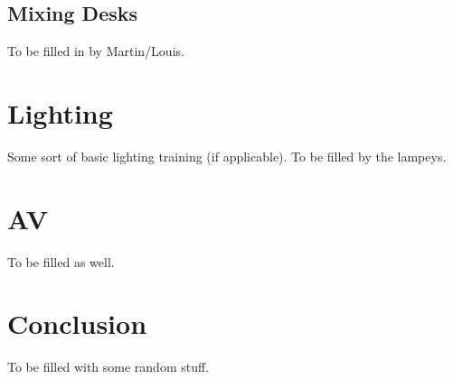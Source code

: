 \documentclass[14pt,twocolumn]{extarticle} %
\begin{document}
\subsection{Mixing Desks}
\label{mixing-desks}
To be filled in by Martin/Louis.

\section{Lighting}
\label{lighting}
Some sort of basic lighting training (if applicable). To be filled by the lampeys.

\section{AV}
\label{av}
To be filled as well.

\section{Conclusion}
\label{conclusion}
To be filled with some random stuff.

%

 
\end{document}
